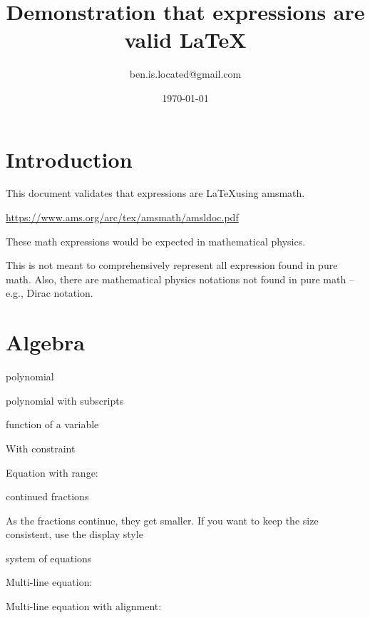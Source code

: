 \documentclass{article}
\title{Demonstration that expressions are valid \LaTeX}
\author{ben.is.located@gmail.com}
\date{\today}
\begin{document}
\maketitle

\section{Introduction}
This document validates that expressions are \LaTeX using amsmath. 

\href{https://www.ams.org/arc/tex/amsmath/amsldoc.pdf}{https://www.ams.org/arc/tex/amsmath/amsldoc.pdf}

These math expressions would be expected in mathematical physics.

This is not meant to comprehensively represent all expression found in pure math. Also, there are mathematical physics notations not found in pure math -- e.g., Dirac notation.

\section{Algebra}
    

polynomial
    

polynomial with subscripts
    

    

    

    

function of a variable
    

With constraint
    

Equation with range:
    





continued fractions
    

As the fractions continue, they get smaller. If you want to keep the size consistent, use the display style
    

system of equations


Multi-line equation:
    

Multi-line equation with alignment:

\end{document}
